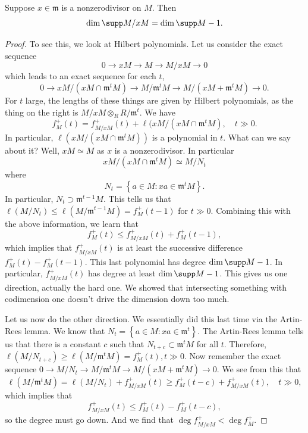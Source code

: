 \begin{proposition} \label{dimdropsbyone}
Suppose $x \in \mathfrak{m}$ is a nonzerodivisor on $M$. Then 
\[ \dim \supp M/xM = \dim \supp M - 1.  \]
\end{proposition} 
\begin{proof} 
To see this, we look at Hilbert polynomials. Let us consider the exact sequence
\[ 0 \to xM \to M \to M/xM \to 0  \]
which leads to an exact sequence for each $t$,
\[ 0 \to xM/(xM \cap \mathfrak{m}^t M) \to M/\mathfrak{m}^t M \to M/(xM  +
\mathfrak{m}^t M) \to 0 . \]
For $t$ large, the lengths of these things are given by Hilbert polynomials,
as the thing on the right is $M/xM \otimes_R R/\mathfrak{m}^t$. 
We have
\[ f_M^+(t) = f_{M/xM}^+(t) + \ell(xM/ (x M \cap \mathfrak{m}^t M), \quad t
\gg 0.  \]
In particular, $\ell( xM/ (xM \cap \mathfrak{m}^t M))$ is a polynomial in $t$.
What can we say about it? Well, $xM \simeq M$ as $x$ is a nonzerodivisor. In
particular
\[ xM / (xM \cap \mathfrak{m}^t M) \simeq M/N_t  \]
where
\[ N_t = \left\{a \in M: xa \in \mathfrak{m}^t M\right\} . \]
In particular, $N_t \supset \mathfrak{m}^{t-1} M$. This tells us that
$\ell(M/N_t) \leq \ell(M/\mathfrak{m}^{t-1} M) = f_M^+(t-1)$ for $t \gg 0$.
Combining this with the above information, we learn that
\[ f_M^+(t) \leq f_{M/xM}^+(t) + f_M^+(t-1),   \]
which implies that $f_{M/xM}^+(t)$ is at least the successive difference
$f_M^+(t) - f_M^+(t-1)$. This last polynomial has degree $\dim \supp M -1$. In
particular, $f_{M/xM}^+(t)$ has degree at least $\dim \supp M -1 $. This gives
us one direction, actually the hard one. We showed that intersecting something with codimension one
doesn't drive the dimension down too much. 

Let us now do the other direction. We essentially did this last time via the
Artin-Rees lemma. We know that $N_t = \left\{a \in M: xa \in
\mathfrak{m}^t\right\}$. The Artin-Rees lemma tells us that there is a constant
$c$ such that $N_{t+c} \subset \mathfrak{m}^t M$ for all $t$. Therefore,
$\ell(M/N_{t+c}) \geq \ell(M/\mathfrak{m}^t M) = f_M^+(t), t \gg 0$. Now
remember the exact sequence $0 \to M/N_t \to M/\mathfrak{m}^t M \to M/(xM +
\mathfrak{m}^t M) \to 0$. We see from this that
\[ \ell(M/ \mathfrak{m}^t M) = \ell(M/N_t) + f_{M/xM}^+(t) \geq f_M^+(t-c) +
f_{M/xM}^+(t), \quad t \gg 0,  \]
which implies that
\[ f_{M/xM}^+(t) \leq f_M^+(t) - f_M^+(t-c),  \]
so the degree must go down. And we find that $\deg f_{M/xM}^+ < \deg f_{M}^+$.
\end{proof} 

